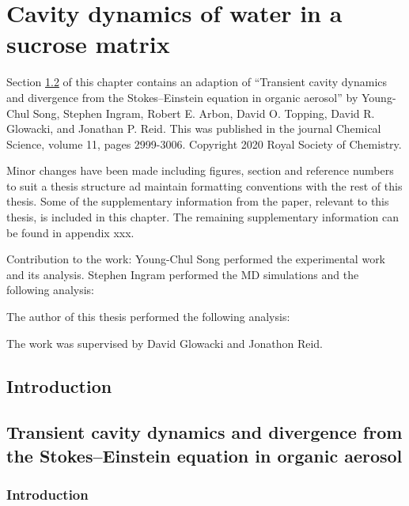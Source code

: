 %
%
\let\textcircled=\pgftextcircled
\chapter{Cavity dynamics of water in a sucrose matrix}
\label{chap:water}


Section \ref{sec:wat_paper} of this chapter contains an adaption of ``Transient cavity dynamics and divergence from the Stokes–Einstein equation in organic aerosol'' by Young-Chul Song, Stephen Ingram, Robert E. Arbon, David O. Topping, David R. Glowacki, and Jonathan P. Reid. This was published in the journal Chemical Science, volume 11, pages 2999-3006. Copyright 2020 Royal Society of Chemistry. 

Minor changes have been made including figures, section and reference numbers to suit a thesis structure ad maintain formatting conventions with the rest of this thesis. Some of the supplementary information from the paper, relevant to this thesis, is included in this chapter. The remaining supplementary information can be found in appendix  xxx. 

Contribution to the work: Young-Chul Song performed the experimental work and its analysis. Stephen Ingram performed the MD simulations and the following analysis: 

The author of this thesis performed the following analysis: 


The work was supervised by David Glowacki and Jonathon Reid. 

\section{Introduction}

\section{Transient cavity dynamics and divergence from the Stokes–Einstein equation in organic aerosol}\label{sec:wat_paper}
\subsection{Introduction}


